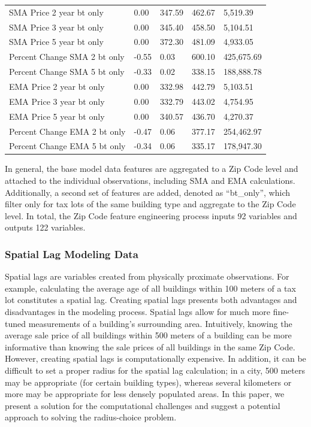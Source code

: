 \documentclass[12pt,]{article}
\begin{document}
\begin{table}
{\begin{tabular}[t]{lllll}
\addlinespace
SMA Price 2 year bt only & 0.00 & 347.59 & 462.67 & 5,519.39\\
SMA Price 3 year bt only & 0.00 & 345.40 & 458.50 & 5,104.51\\
SMA Price 5 year bt only & 0.00 & 372.30 & 481.09 & 4,933.05\\
Percent Change SMA 2 bt only & -0.55 & 0.03 & 600.10 & 425,675.69\\
Percent Change SMA 5 bt only & -0.33 & 0.02 & 338.15 & 188,888.78\\
\addlinespace
EMA Price 2 year bt only & 0.00 & 332.98 & 442.79 & 5,103.51\\
EMA Price 3 year bt only & 0.00 & 332.79 & 443.02 & 4,754.95\\
EMA Price 5 year bt only & 0.00 & 340.57 & 436.70 & 4,270.37\\
Percent Change EMA 2 bt only & -0.47 & 0.06 & 377.17 & 254,462.97\\
Percent Change EMA 5 bt only & -0.34 & 0.06 & 335.17 & 178,947.30\\
\bottomrule
\end{tabular}}
\end{table}

In general, the base model data features are aggregated to a Zip Code
level and attached to the individual observations, including SMA and EMA
calculations. Additionally, a second set of features are added, denoted
as ``bt\_only'', which filter only for tax lots of the same building
type and aggregate to the Zip Code level. In total, the Zip Code feature
engineering process inputs 92 variables and outputs 122 variables.

\hypertarget{spatial-lag-modeling-data}{%
\subsubsection{Spatial Lag Modeling
Data}\label{spatial-lag-modeling-data}}

Spatial lags are variables created from physically proximate
observations. For example, calculating the average age of all buildings
within 100 meters of a tax lot constitutes a spatial lag. Creating
spatial lags presents both advantages and disadvantages in the modeling
process. Spatial lags allow for much more fine-tuned measurements of a
building's surrounding area. Intuitively, knowing the average sale price
of all buildings within 500 meters of a building can be more informative
than knowing the sale prices of all buildings in the same Zip Code.
However, creating spatial lags is computationally expensive. In
addition, it can be difficult to set a proper radius for the spatial lag
calculation; in a city, 500 meters may be appropriate (for certain
building types), whereas several kilometers or more may be appropriate
for less densely populated areas. In this paper, we present a solution
for the computational challenges and suggest a potential approach to
solving the radius-choice problem.
\end{document}
